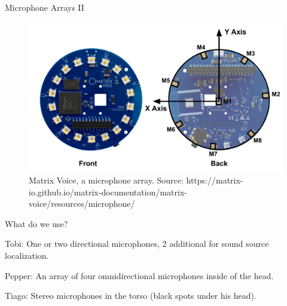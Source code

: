 \documentclass{beamer}
\begin{document}
	\begin{frame}{Microphone Arrays II}
		\begin{figure}[ht]
			\centering
			\includegraphics[width=.8\linewidth]{Bilder/mic_voice_position.png}
			\caption{Matrix Voice, a microphone array. Source: https://matrix-io.github.io/matrix-documentation/matrix-voice/resources/microphone/}
		\end{figure}
	\end{frame}
	
	\begin{frame}{What do we use?}

		\begin{alertblock}{Tobi:}
			\pause
			One or two directional microphones, 2 additional for sound source localization.
		\end{alertblock}
		
		\begin{alertblock}{Pepper:}
			\pause
			An array of four omnidirectional microphones inside of the head.
		\end{alertblock}
		
		\begin{alertblock}{Tiago:}
			\pause
			Stereo microphones in the torso (black spots under his head).
		\end{alertblock}
	\end{frame}
	
\end{document}
